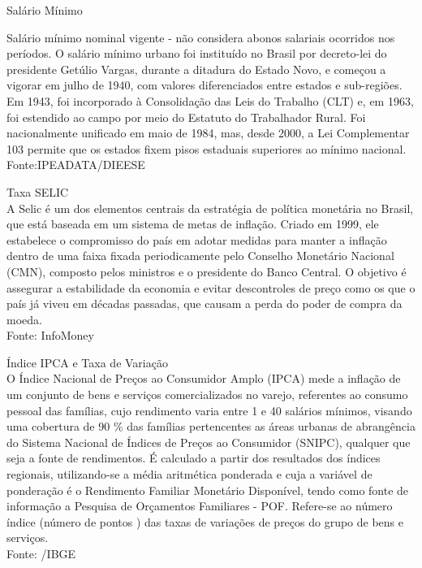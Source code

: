 \documentclass[
]{article}
\begin{document}
Salário Mínimo

Salário mínimo nominal vigente - não considera abonos salariais
ocorridos nos períodos. O salário mínimo urbano foi instituído no Brasil
por decreto-lei do presidente Getúlio Vargas, durante a ditadura do
Estado Novo, e começou a vigorar em julho de 1940, com valores
diferenciados entre estados e sub-regiões. Em 1943, foi incorporado à
Consolidação das Leis do Trabalho (CLT) e, em 1963, foi estendido ao
campo por meio do Estatuto do Trabalhador Rural. Foi nacionalmente
unificado em maio de 1984, mas, desde 2000, a Lei Complementar 103
permite que os estados fixem pisos estaduais superiores ao mínimo
nacional. Fonte:IPEADATA/DIEESE

Taxa SELIC\\
A Selic é um dos elementos centrais da estratégia de política monetária
no Brasil, que está baseada em um sistema de metas de inflação. Criado
em 1999, ele estabelece o compromisso do país em adotar medidas para
manter a inflação dentro de uma faixa fixada periodicamente pelo
Conselho Monetário Nacional (CMN), composto pelos ministros e o
presidente do Banco Central. O objetivo é assegurar a estabilidade da
economia e evitar descontroles de preço como os que o país já viveu em
décadas passadas, que causam a perda do poder de compra da moeda.\\
Fonte: InfoMoney

Índice IPCA e Taxa de Variação\\
O Índice Nacional de Preços ao Consumidor Amplo (IPCA) mede a inflação
de um conjunto de bens e serviços comercializados no varejo, referentes
ao consumo pessoal das famílias, cujo rendimento varia entre 1 e 40
salários mínimos, visando uma cobertura de 90 \% das famílias
pertencentes as áreas urbanas de abrangência do Sistema Nacional de
Índices de Preços ao Consumidor (SNIPC), qualquer que seja a fonte de
rendimentos. É calculado a partir dos resultados dos índices regionais,
utilizando-se a média aritmética ponderada e cuja a variável de
ponderação é o Rendimento Familiar Monetário Disponível, tendo como
fonte de informação a Pesquisa de Orçamentos Familiares - POF. Refere-se
ao número índice (número de pontos ) das taxas de variações de preços do
grupo de bens e serviços.\\
Fonte: /IBGE
\end{document}
